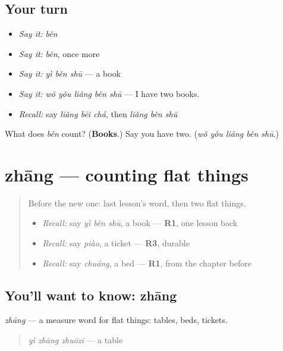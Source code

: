 \subsection*{Your turn}
\begin{itemize}
\raggedright
  \item \emph{Say it:} \emph{běn}
  \item \emph{Say it:} \emph{běn}, once more
  \item \emph{Say it:} \emph{yì běn shū} — a book
  \item \emph{Say it:} \emph{wǒ yǒu liǎng běn shū} — I have two books.
  \item \emph{Recall:} say \emph{liǎng bēi chá}, then \emph{liǎng běn shū}
\end{itemize}

\begin{tcolorbox}[breakable,colback=teal!4,colframe=teal!35!black,title={Before you move on}]
What does \emph{běn} count? (\textbf{Books}.) Say you have two. (\emph{wǒ yǒu liǎng běn shū}.)
\end{tcolorbox}
\section[zhāng]{zhāng — counting flat things}

\label{lesson:ZH-C88-zhang}



\begin{quote}
Before the new one: last lesson's word, then two flat things.

\begin{itemize}
\raggedright
  \item \emph{Recall:} say \emph{yì běn shū}, a book — \textbf{R1}, one lesson back
  \item \emph{Recall:} say \emph{piào}, a ticket — \textbf{R3}, durable
  \item \emph{Recall:} say \emph{chuáng}, a bed — \textbf{R1}, from the chapter before
\end{itemize}
\end{quote}

\subsection*{You'll want to know: zhāng}
\emph{zhāng} — a measure word for flat things: tables, beds, tickets.

\begin{quote}
\emph{yì zhāng zhuōzi} — a table
\end{quote}

